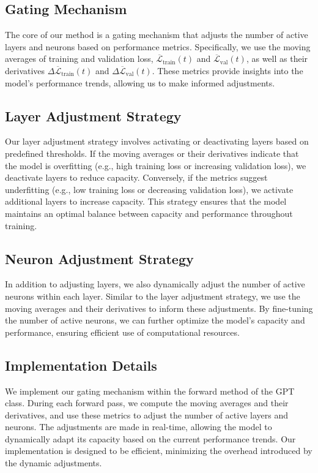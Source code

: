 \documentclass{article} %
\begin{document}
\subsection{Gating Mechanism}
The core of our method is a gating mechanism that adjusts the number of active layers and neurons based on performance metrics. Specifically, we use the moving averages of training and validation loss, $\overline{\mathcal{L}}_{\text{train}}(t)$ and $\overline{\mathcal{L}}_{\text{val}}(t)$, as well as their derivatives $\Delta \overline{\mathcal{L}}_{\text{train}}(t)$ and $\Delta \overline{\mathcal{L}}_{\text{val}}(t)$. These metrics provide insights into the model's performance trends, allowing us to make informed adjustments.

\subsection{Layer Adjustment Strategy}
Our layer adjustment strategy involves activating or deactivating layers based on predefined thresholds. If the moving averages or their derivatives indicate that the model is overfitting (e.g., high training loss or increasing validation loss), we deactivate layers to reduce capacity. Conversely, if the metrics suggest underfitting (e.g., low training loss or decreasing validation loss), we activate additional layers to increase capacity. This strategy ensures that the model maintains an optimal balance between capacity and performance throughout training.

\subsection{Neuron Adjustment Strategy}
In addition to adjusting layers, we also dynamically adjust the number of active neurons within each layer. Similar to the layer adjustment strategy, we use the moving averages and their derivatives to inform these adjustments. By fine-tuning the number of active neurons, we can further optimize the model's capacity and performance, ensuring efficient use of computational resources.

\subsection{Implementation Details}
We implement our gating mechanism within the forward method of the GPT class. During each forward pass, we compute the moving averages and their derivatives, and use these metrics to adjust the number of active layers and neurons. The adjustments are made in real-time, allowing the model to dynamically adapt its capacity based on the current performance trends. Our implementation is designed to be efficient, minimizing the overhead introduced by the dynamic adjustments.
\end{document}
